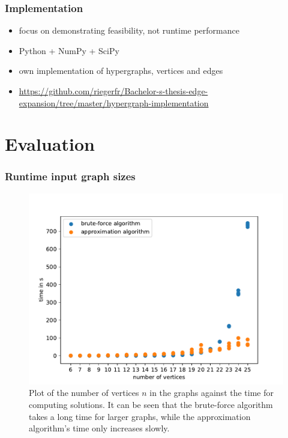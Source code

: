 \documentclass{beamer}
\begin{document}
\begin{frame}
\frametitle{Implementation}
\begin{itemize}
	\item focus on demonstrating feasibility, not runtime performance
	\item Python + NumPy + SciPy
	\item own implementation of hypergraphs, vertices and edges
	\item \href{https://github.com/riegerfr/Bachelor-s-thesis-edge-expansion/tree/master/hypergraph-implementation}{https://github.com/riegerfr/Bachelor-s-thesis-edge-expansion/tree/master/hypergraph-implementation}
\end{itemize}



\end{frame}

\section{Evaluation}
\begin{frame}
\frametitle{Runtime input graph sizes}
\begin{figure}[H]
	\centering
	\includegraphics[scale=0.5]{figures/number_vertices_all_logs.pdf}
	\caption[Plot graph size against time]{Plot of the number of vertices $n$ in the graphs against the time for computing solutions. It can be seen that the brute-force algorithm takes a long time for larger graphs, while the approximation algorithm's time only increases slowly.\label{fig:no_vertices_time}}
\end{figure}
\end{frame}
\end{document}
